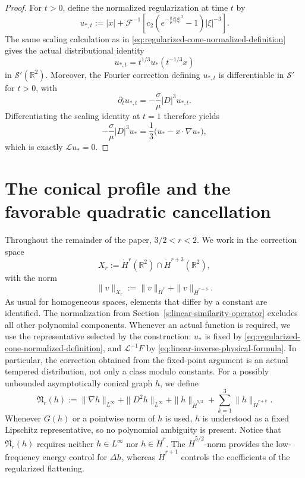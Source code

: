 \documentclass[12pt]{amsart}
\theoremstyle{remark}
\theoremstyle{definition}
\numberwithin{equation}{section}
\newcommand{\R}{\mathbb{R}}
\begin{document}
\begin{proof}
For \(t>0\), define the normalized regularization at time \(t\) by
\[
 u_{*,t}:=|x|+\mathcal F^{-1}\left[c_2\left(e^{-\frac{\sigma}{\mu}t|\xi|^3}-1\right)|\xi|^{-3}\right].
\]
The same scaling calculation as in \eqref{eq:regularized-cone-normalized-definition} gives the actual distributional identity
\begin{equation*}
 u_{*,t}=t^{1/3}u_*(t^{-1/3}x)
\end{equation*}
in \(\mathcal S'(\R^2)\).
Moreover, the Fourier correction defining \(u_{*,t}\) is differentiable in \(\mathcal S'\) for \(t>0\), with
\[
 \partial_t u_{*,t}=-\frac{\sigma}{\mu}|D|^3u_{*,t}.
\]
Differentiating the scaling identity at \(t=1\) therefore yields
\[
 -\frac{\sigma}{\mu}|D|^3u_* = \frac13 \bigl( u_*-x\cdot\nabla u_* \bigr),
\]
which is exactly \(\mathcal Lu_*=0\).
\end{proof}

\section{The conical profile and the favorable quadratic cancellation}
\label{s:cone-capillary-expansion-revised}

Throughout the remainder of the paper, \(3/2<r<2\). We work in the
correction space
\[
 X_r:=\dot H^r(\R^2)\cap\dot H^{r+3}(\R^2),
\]
with the norm
\[
 \|v\|_{X_r} := \|v\|_{\dot H^r}+\|v\|_{\dot H^{r+3}}.
\]
As usual for homogeneous spaces, elements that differ by a constant are
identified. The normalization from
Section~\ref{s:linear-similarity-operator} excludes all other polynomial
components. Whenever an actual function is required, we use the
representative selected by the construction: \(u_*\) is fixed by
\eqref{eq:regularized-cone-normalized-definition}, and
\(\mathcal L^{-1}F\) by \eqref{eq:linear-inverse-physical-formula}. In
particular, the correction obtained from the fixed-point argument is an
actual tempered distribution, not only a class modulo constants.
For a possibly unbounded asymptotically conical graph \(h\), we define
\begin{equation*}
 \mathfrak N_r(h) := \|\nabla h\|_{L^\infty} +\|D^2h\|_{L^\infty} +\|h\|_{\dot H^{5/2}} +\sum_{k=1}^3\|h\|_{\dot H^{r+k}}.
\end{equation*}
Whenever \(G(h)\) or a pointwise norm of \(h\) is used, \(h\) is understood as a fixed Lipschitz representative, so no polynomial ambiguity is present.
Notice that \(\mathfrak N_r(h)\) requires neither \(h\in L^\infty\) nor \(h\in\dot H^r\).
The \(\dot H^{5/2}\)-norm provides the low-frequency energy control for
\(\Delta h\), whereas \(\dot H^{r+1}\) controls the coefficients of the
regularized flattening.
\end{document}
